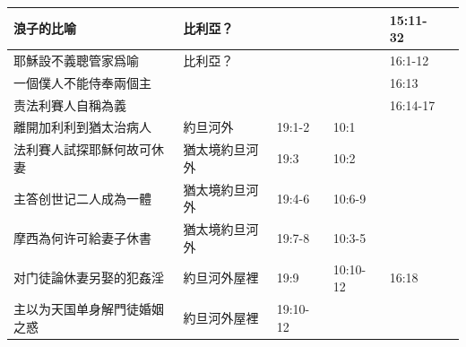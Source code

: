 \begin{table}[H]
\begin{tabular}{p{14em}|p{7.93em}|l|l|l|p{4.855em}}
浪子的比喻 & 比利亞？   &&       & \multicolumn{1}{p{5.285em}|}{15:11-32} & \multicolumn{1}{l}{} \\ \midrule

耶穌設不義聰管家爲喻 & 比利亞？   &       &       & \multicolumn{1}{p{5.285em}|}{16:1-12} & \multicolumn{1}{l}{} \\\midrule
一個僕人不能侍奉兩個主&   &       &       & \multicolumn{1}{p{5.285em}|}{16:13} & \multicolumn{1}{l}{} \\\midrule
责法利賽人自稱為義&   &       &       & \multicolumn{1}{p{5.285em}|}{16:14-17} & \multicolumn{1}{l}{} \\\midrule




離開加利利到猶太治病人& \multicolumn{1}{p{7.93em}|}{約旦河外} & \multicolumn{1}{p{5.285em}|}{19:1-2} &10:1 & &\multicolumn{1}{p{4.855em}}{} \\\midrule

法利賽人試探耶穌何故可休妻&猶太境約旦河外 &19:3&10:2& \multicolumn{1}{p{5.285em}|}{} & \multicolumn{1}{l}{} \\\midrule
主答创世记二人成為一體&猶太境約旦河外 &19:4-6&10:6-9& \multicolumn{1}{p{5.285em}|}{} & \multicolumn{1}{l}{} \\\midrule
摩西為何许可給妻子休書&猶太境約旦河外 &19:7-8&10:3-5& \multicolumn{1}{p{5.285em}|}{} & \multicolumn{1}{l}{} \\\midrule

对门徒論休妻另娶的犯姦淫&約旦河外屋裡 & 19:9 &10:10-12& \multicolumn{1}{p{5.285em}|}{16:18} & \multicolumn{1}{l}{} \\\midrule
主以为天国单身解門徒婚姻之惑&約旦河外屋裡  & \multicolumn{1}{p{5.285em}|}{19:10-12} & \multicolumn{1}{p{5.57em}|}{} &       & \multicolumn{1}{l}{} \\\midrule


\end{tabular}
\end{table}
